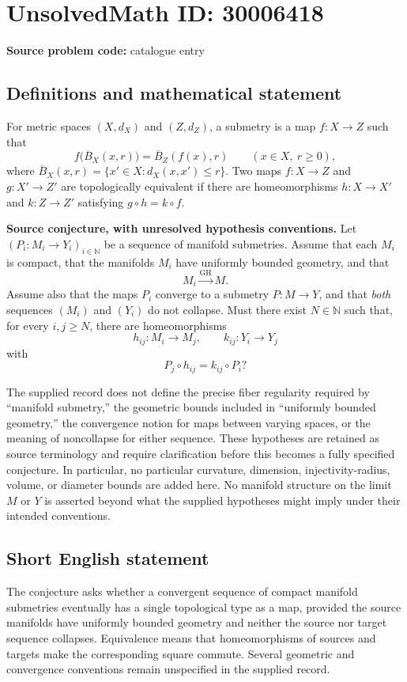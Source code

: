 \documentclass[11pt]{article}
\newcommand{\N}{\mathbb{N}}
\begin{document}
\section*{UnsolvedMath ID: 30006418}
\textbf{Source problem code:} catalogue entry
\subsection{Definitions and mathematical statement}
For metric spaces \((X,d_X)\) and \((Z,d_Z)\), a submetry is a map \(f:X\to Z\) such that
\[
f\bigl(\overline B_X(x,r)\bigr)=\overline B_Z(f(x),r)
\qquad(x\in X,\ r\geq 0),
\]
where \(\overline B_X(x,r)=\{x'\in X:d_X(x,x')\leq r\}\). Two maps \(f:X\to Z\) and \(g:X'\to Z'\) are topologically equivalent if there are homeomorphisms \(h:X\to X'\) and \(k:Z\to Z'\) satisfying \(g\circ h=k\circ f\).

\textbf{Source conjecture, with unresolved hypothesis conventions.} Let \((P_i:M_i\to Y_i)_{i\in\N}\) be a sequence of manifold submetries. Assume that each \(M_i\) is compact, that the manifolds \(M_i\) have uniformly bounded geometry, and that
\[
M_i\xrightarrow{\mathrm{GH}}M.
\]
Assume also that the maps \(P_i\) converge to a submetry \(P:M\to Y\), and that \emph{both} sequences \((M_i)\) and \((Y_i)\) do not collapse. Must there exist \(N\in\N\) such that, for every \(i,j\geq N\), there are homeomorphisms
\[
h_{ij}:M_i\longrightarrow M_j,
\qquad
k_{ij}:Y_i\longrightarrow Y_j
\]
with
\[
P_j\circ h_{ij}=k_{ij}\circ P_i?
\]

The supplied record does not define the precise fiber regularity required by ``manifold submetry,'' the geometric bounds included in ``uniformly bounded geometry,'' the convergence notion for maps between varying spaces, or the meaning of noncollapse for either sequence. These hypotheses are retained as source terminology and require clarification before this becomes a fully specified conjecture. In particular, no particular curvature, dimension, injectivity-radius, volume, or diameter bounds are added here. No manifold structure on the limit \(M\) or \(Y\) is asserted beyond what the supplied hypotheses might imply under their intended conventions.
\subsection{Short English statement}
The conjecture asks whether a convergent sequence of compact manifold submetries eventually has a single topological type as a map, provided the source manifolds have uniformly bounded geometry and neither the source nor target sequence collapses. Equivalence means that homeomorphisms of sources and targets make the corresponding square commute. Several geometric and convergence conventions remain unspecified in the supplied record.
\end{document}
